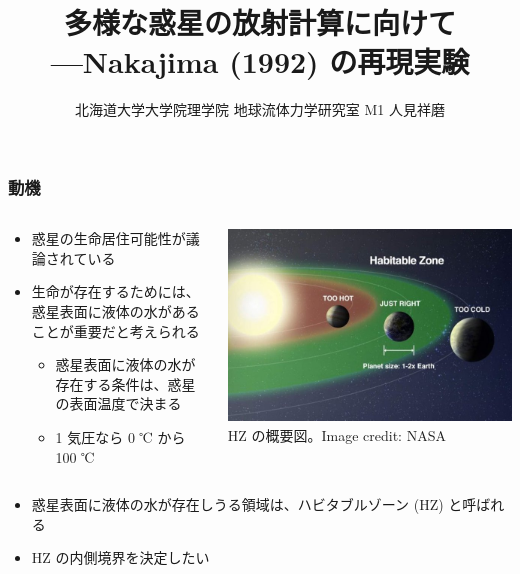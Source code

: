 \documentclass[aspectratio=149]{beamer}
\author{北海道大学大学院理学院 地球流体力学研究室 M1 人見祥磨}
\title{多様な惑星の放射計算に向けて\\---Nakajima \etal (1992) の再現実験}
\begin{document}
\begin{frame}
	\maketitle
\end{frame}

\begin{frame}
	\frametitle{動機}
	\begin{columns}[T,onlytextwidth]
		\begin{column}{.5\textwidth}
			\begin{itemize}
				\item 惑星の生命居住可能性が議論されている
				\item 生命が存在するためには、惑星表面に液体の水があることが重要だと考えられる
					\begin{itemize}
						\item 惑星表面に液体の水が存在する条件は、惑星の表面温度で決まる
						\item 1 気圧なら 0 ℃ から 100 ℃
					\end{itemize}
			\end{itemize}
		\end{column}
		\begin{column}{.45\textwidth}
			\centering
			\includegraphics[width=\textwidth]{hz.jpg}\\
			\scriptsize HZ の概要図。Image credit: NASA
		\end{column}
	\end{columns}
	\begin{itemize}
		\item 惑星表面に液体の水が存在しうる領域は、ハビタブルゾーン (HZ)
			と呼ばれる
		\item HZ の内側境界を決定したい
	\end{itemize}
\end{frame}
\end{document}
